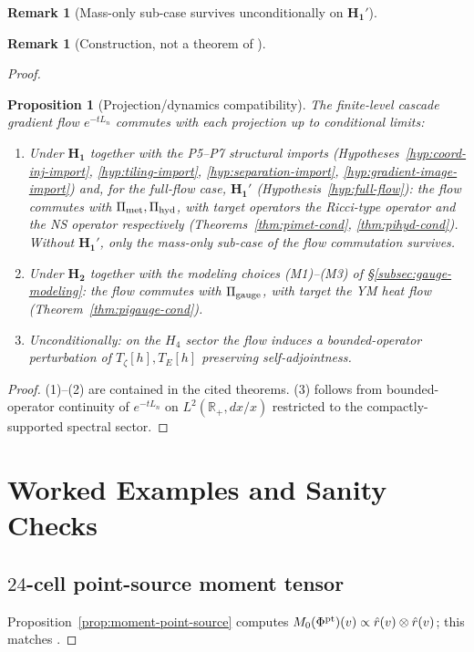 \documentclass[11pt, a4paper]{amsart}
\newtheorem{proposition}[theorem]{Proposition}
\theoremstyle{definition}
\newtheorem{remark}[theorem]{Remark}
\newcommand{\R}{\mathbb{R}}
\newcommand{\met}{{\rm met}}
\newcommand{\hyd}{{\rm hyd}}
\newcommand{\gge}{{\rm gauge}}
\begin{document}
\begin{remark}[Mass-only sub-case survives unconditionally on $\mathbf{H_1'}$]
\begin{remark}[Construction, not a theorem of \cite{CascadeEmbeddings}]
\begin{proof}
\begin{proposition}[Projection/dynamics compatibility]
\label{prop:proj-dynamics-compat}
The finite-level cascade gradient flow $e^{-t L_n}$ commutes with
each projection up to conditional limits:
\begin{enumerate}
\item Under $\mathbf{H_1}$ \emph{together with} the P5--P7
  structural imports (Hypotheses~\ref{hyp:coord-inj-import},
  \ref{hyp:tiling-import}, \ref{hyp:separation-import},
  \ref{hyp:gradient-image-import}) and, for the full-flow case,
  $\mathbf{H_1'}$ (Hypothesis~\ref{hyp:full-flow}): the flow
  commutes with $\Pi_{\met}, \Pi_{\hyd}$, with target operators
  the Ricci-type operator and the NS operator respectively
  (Theorems~\ref{thm:pimet-cond}, \ref{thm:pihyd-cond}). Without
  $\mathbf{H_1'}$, only the mass-only sub-case of the flow
  commutation survives.
\item Under $\mathbf{H_2}$ \emph{together with} the modeling
  choices (M1)--(M3) of \S\ref{subsec:gauge-modeling}: the flow
  commutes with $\Pi_{\gge}$, with target the YM heat flow
  (Theorem~\ref{thm:pigauge-cond}).
\item Unconditionally: on the $H_4$ sector the flow induces a
  bounded-operator perturbation of $T_\zeta[h], T_E[h]$ preserving
  self-adjointness.
\end{enumerate}
\end{proposition}

\begin{proof}
(1)--(2) are contained in the cited theorems.
(3) follows from bounded-operator continuity of $e^{-t L_n}$ on
$L^2(\R_+, dx/x)$ restricted to the compactly-supported spectral
sector.
\end{proof}

\section{Worked Examples and Sanity Checks}
\label{sec:examples}

\subsection{$24$-cell point-source moment tensor}

Proposition~\ref{prop:moment-point-source} computes
$M_0(\Phi^{\rm pt})(v) \propto \hat r(v) \otimes \hat r(v)$; this
matches \cite[\S C4.1]{CascadeGR}.


\end{proof}
\end{remark}
\end{remark}
\end{document}
